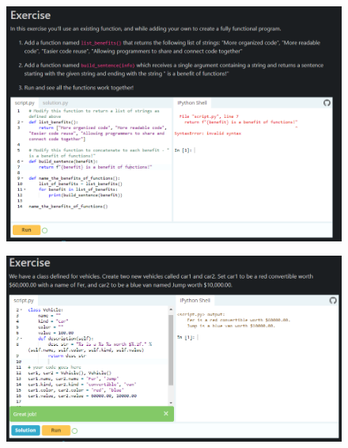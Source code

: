 \documentclass[12pt, a4paper]{article}
\begin{document}
\begin{figure}[h]
\centering
\includegraphics[width=5.5in]{images/q9(part2).png}
\end{figure}
\pagebreak
\begin{figure}[h]
\centering
\includegraphics[width=6in]{images/q10.png}
\end{figure}
\end{document}
